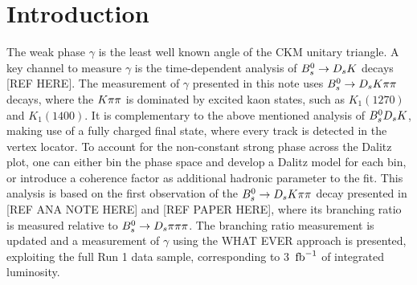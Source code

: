 
\section{Introduction}
\label{sec:Introduction}

The weak phase $\gamma$ is the least well known angle of the CKM unitary triangle. A key channel to measure $\gamma$ is the time-dependent analysis of ${{B}^0_{s}}\rightarrow{\ensuremath{{D}_{s}}}{\ensuremath{K}}$ decays [REF HERE]. \newline
The measurement of $\gamma$ presented in this note uses ${{B}^0_{s}}\rightarrow{\ensuremath{{D}_{s}}}{\ensuremath{K}}\pi\pi$ decays, where the ${K}{\pi}{\pi}$ is dominated by excited kaon states, such as $K_{1}(1270)$ and $K_{1}(1400)$. 
It is complementary to the above mentioned analysis of ${{B}^0_{s}}{{D}_{s}}{K}$, making use of a fully charged final state, where every track is detected in the vertex locator. 
To account for the non-constant strong phase across the Dalitz plot, one can either bin the phase space and develop a Dalitz model for each bin, or introduce a coherence factor as additional hadronic parameter to the fit. \newline
This analysis is based on the first observation of the ${{B}^0_{s}}\rightarrow{\ensuremath{{D}_{s}}}{\ensuremath{K}}{\ensuremath{\pi}}{\ensuremath{\pi}}$ decay presented in [REF ANA NOTE HERE] and [REF PAPER HERE], where its branching ratio is measured relative to ${{B}^0_{s}}\rightarrow{\ensuremath{{D}_{s}}}{\ensuremath{\pi}}{\ensuremath{\pi}}{\ensuremath{\pi}}$. 
The branching ratio measurement is updated and a measurement of $\gamma$ using the WHAT EVER approach is presented, exploiting the full Run 1 data sample, corresponding to 3 $\mbox{\,fb}^{-1}$ of integrated luminosity.         
